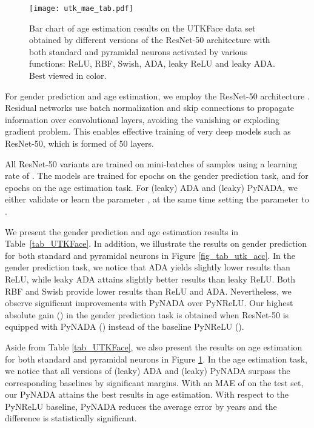 \documentclass[pdflatex,sn-mathphys]{sn-jnl}
\theoremstyle{thmstyleone}
\theoremstyle{thmstyletwo}\newtheorem{example}{Example}\newtheorem{remark}{Remark}
\theoremstyle{thmstylethree}\newtheorem{definition}{Definition}\DeclareMathOperator{\sinc}{sinc}
\begin{document}
\begin{figure}[!t]
\begin{center}
\centerline{\texttt{[image: utk\_mae\_tab.pdf]}}
\caption{Bar chart of age estimation results on the UTKFace data set obtained by different versions of the ResNet-50 architecture with both standard and pyramidal neurons activated by various functions: ReLU, RBF, Swish, ADA, leaky ReLU and leaky ADA. Best viewed in color.}
\label{fig_tab_utk_mae}
\end{center}
\end{figure}

For gender prediction and age estimation, we employ the ResNet-50 architecture \citep{He-CVPR-2016}. Residual networks use batch normalization and skip connections to propagate information over convolutional layers, avoiding the vanishing or exploding gradient problem. This enables effective training of very deep models such as ResNet-50, which is formed of 50 layers. 

 All ResNet-50 variants are trained on mini-batches of  samples using a learning rate of . The models are trained for  epochs on the gender prediction task, and for  epochs on the age estimation task. For (leaky) ADA and (leaky) PyNADA, we either validate or learn the parameter , at the same time setting the parameter  to .

We present the gender prediction and age estimation results in Table~\ref{tab_UTKFace}. In addition, we illustrate the results on gender prediction for both standard and pyramidal neurons in Figure \ref{fig_tab_utk_acc}. In the gender prediction task, we notice that ADA yields slightly lower results than ReLU, while leaky ADA attains slightly better results than leaky ReLU. Both RBF and Swish provide lower results than ReLU and ADA. Nevertheless, we observe significant improvements with PyNADA over PyNReLU. Our highest absolute gain () in the gender prediction task is obtained when ResNet-50 is equipped with PyNADA () instead of the baseline PyNReLU ().

Aside from Table \ref{tab_UTKFace}, we also present the results on age estimation for both standard and pyramidal neurons in Figure \ref{fig_tab_utk_mae}. In the age estimation task, we notice that all versions of (leaky) ADA and (leaky) PyNADA surpass the corresponding baselines by significant margins. With an MAE of  on the test set, our PyNADA attains the best results in age estimation. With respect to the PyNReLU baseline, PyNADA reduces the average error by  years and the difference is statistically significant.
\end{document}
